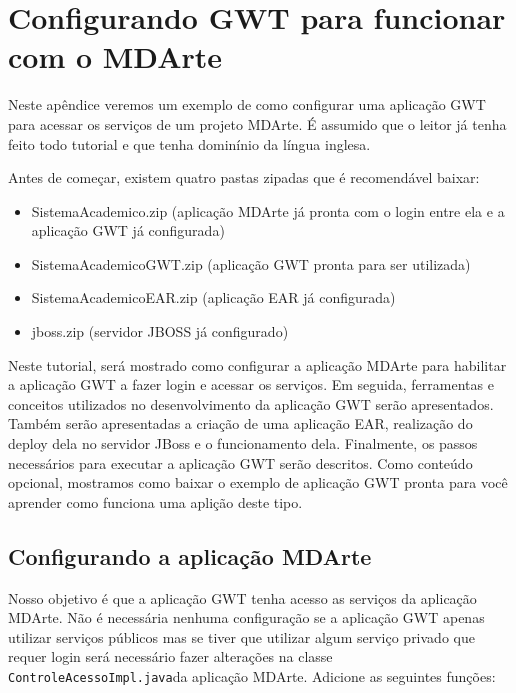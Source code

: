 \chapter{Configurando GWT para funcionar com o MDArte}
\label{gwt-config}
Neste apêndice veremos um exemplo de como configurar uma aplicação GWT para acessar os serviços de um projeto MDArte. É assumido
que o leitor já tenha feito todo tutorial e que tenha dominínio da língua inglesa.

Antes de começar, existem quatro pastas zipadas que é recomendável baixar:

\begin{itemize}
  \item SistemaAcademico.zip (aplicação MDArte já pronta com o login entre ela
  e a aplicação GWT já configurada)
  \item SistemaAcademicoGWT.zip (aplicação GWT pronta para ser utilizada)
  \item SistemaAcademicoEAR.zip (aplicação EAR já configurada)
  \item jboss.zip (servidor JBOSS já configurado)
\end{itemize}

Neste tutorial, será mostrado como configurar a aplicação MDArte para habilitar a aplicação GWT a fazer login e acessar os
serviços. Em seguida, ferramentas e conceitos utilizados no desenvolvimento da aplicação GWT serão apresentados. Também serão
apresentadas a criação de uma aplicação EAR, realização do deploy dela no servidor JBoss e o funcionamento dela. Finalmente, os
passos necessários para executar a aplicação GWT serão descritos. Como conteúdo opcional, mostramos como baixar o exemplo de
aplicação GWT pronta para você aprender como funciona uma aplição deste tipo.

\section{Configurando a aplicação MDArte}

Nosso objetivo é que a aplicação GWT tenha acesso as serviços da aplicação MDArte. Não é necessária nenhuma configuração se a
aplicação GWT apenas utilizar serviços públicos mas se tiver que utilizar algum serviço privado que requer login será necessário
fazer alterações na classe \texttt{ControleAcessoImpl.java}da aplicação MDArte. Adicione as seguintes funções:

